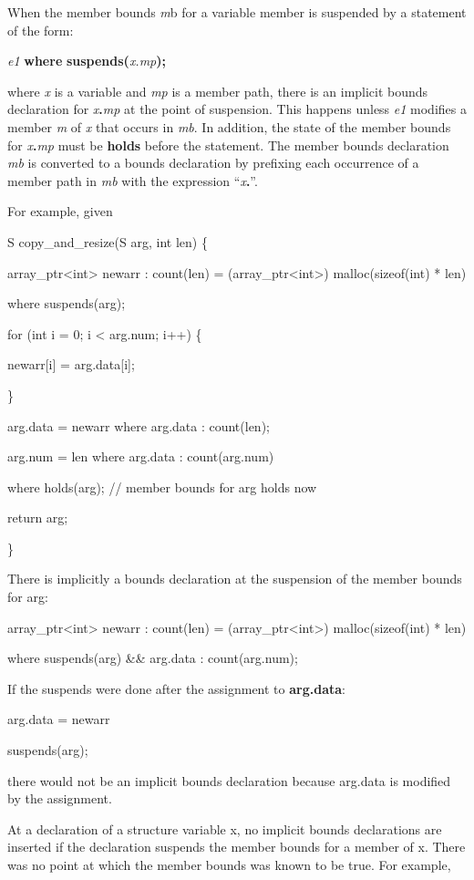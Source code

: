 \documentclass[]{article}
\begin{document}
When the member bounds \emph{m}b for a variable member is suspended by a
statement of the form:

\emph{e1} \textbf{where} \textbf{suspends(}\emph{x.mp}\textbf{);}

where \emph{x} is a variable and \emph{mp} is a member path, there is an
implicit bounds declaration for \emph{x}\textbf{.}\emph{mp} at the point
of suspension. This happens unless \emph{e1} modifies a member \emph{m}
of \emph{x} that occurs in \emph{mb}. In addition, the state of the
member bounds for \emph{x}\textbf{.}\emph{mp} must be \textbf{holds}
before the statement. The member bounds declaration \emph{mb} is
converted to a bounds declaration by prefixing each occurrence of a
member path in \emph{mb} with the expression ``\emph{x}\textbf{.}''.

For example, given

S copy\_and\_resize(S arg, int len) \{

array\_ptr\textless{}int\textgreater{} newarr : count(len) =
(array\_ptr\textless{}int\textgreater{}) malloc(sizeof(int) * len)

where suspends(arg);

for (int i = 0; i \textless{} arg.num; i++) \{

newarr{[}i{]} = arg.data{[}i{]};

\}

arg.data = newarr where arg.data : count(len);

arg.num = len where arg.data : count(arg.num)

where holds(arg); // member bounds for arg holds now

return arg;

\}

There is implicitly a bounds declaration at the suspension of the member
bounds for arg:

array\_ptr\textless{}int\textgreater{} newarr : count(len) =
(array\_ptr\textless{}int\textgreater{}) malloc(sizeof(int) * len)

where suspends(arg) \&\& arg.data : count(arg.num);

If the suspends were done after the assignment to \textbf{arg.data}:

arg.data = newarr

suspends(arg);

there would not be an implicit bounds declaration because arg.data is
modified by the assignment.

At a declaration of a structure variable x, no implicit bounds
declarations are inserted if the declaration suspends the member bounds
for a member of x. There was no point at which the member bounds was
known to be true. For example,
\end{document}
